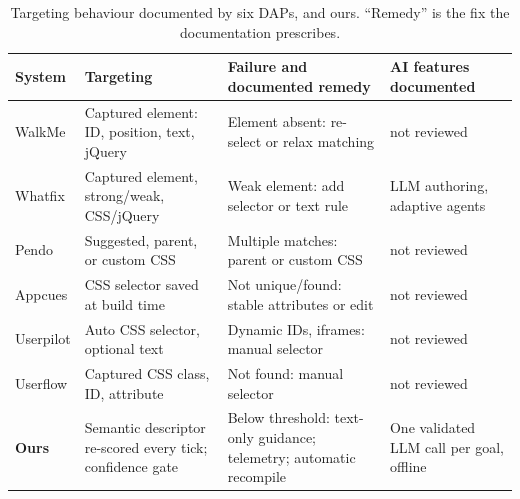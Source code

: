 \documentclass[conference]{IEEEtran}
\begin{document}
\begin{table}[!t]
\caption{Targeting behaviour documented by six DAPs, and ours. ``Remedy'' is the fix the documentation prescribes.}
\label{tab:daps}
\centering\small
\begin{tabular}{@{}p{1.5cm}p{5.0cm}p{5.2cm}p{4.3cm}@{}}
\toprule
System & Targeting & Failure and documented remedy & AI features documented\\
\midrule
WalkMe \cite{walkme_what,walkme_cant_find} & Captured element: ID, position, text, jQuery & Element absent: re-select or relax matching & not reviewed\\
Whatfix \cite{whatfix_visual,whatfix_ai} & Captured element, strong/weak, CSS/jQuery & Weak element: add selector or text rule & LLM authoring, adaptive agents\\
Pendo \cite{pendo_css,pendo_community} & Suggested, parent, or custom CSS & Multiple matches: parent or custom CSS & not reviewed\\
Appcues \cite{appcues_selectors} & CSS selector saved at build time & Not unique/found: stable attributes or edit & not reviewed\\
Userpilot \cite{userpilot_select,userpilot_errors} & Auto CSS selector, optional text & Dynamic IDs, iframes: manual selector & not reviewed\\
Userflow \cite{userflow_tooltip} & Captured CSS class, ID, attribute & Not found: manual selector & not reviewed\\
\midrule
\textbf{Ours} & Semantic descriptor re-scored every tick; confidence gate & Below threshold: text-only guidance; telemetry; automatic recompile & One validated LLM call per goal, offline\\
\bottomrule
\end{tabular}
\end{table}
\end{document}
